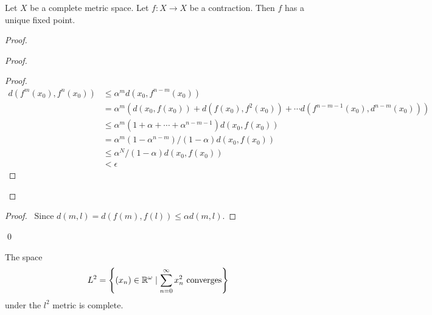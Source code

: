 \begin{proposition}
    Let $X$ be a complete metric space. Let $f : X \rightarrow X$ be a contraction.
    Then $f$ has a unique fixed point.
\end{proposition}

\begin{proof}
    \pf
    \begin{proof}
        \begin{proof}
            \pf
            \begin{align*}
                d(f^m(x_0),f^n(x_0)) & \leq \alpha^m d(x_0,f^{n-m}(x_0)) \\
                & = \alpha^m (d(x_0,f(x_0)) + d(f(x_0),f^2(x_0)) + \cdots d(f^{n-m-1}(x_0),d^{n-m}(x_0))) \\
                & \leq \alpha^m (1 + \alpha + \cdots + \alpha^{n-m-1}) d(x_0,f(x_0)) \\
                & = \alpha^m (1 - \alpha^{n-m})/(1 - \alpha) d(x_0,f(x_0))  \\
                & \leq \alpha^N / (1 - \alpha) d(x_0, f(x_0)) \\ 
                & < \epsilon
            \end{align*}
        \end{proof}
    \end{proof}
    \begin{proof}
        \pf\ Since $d(m,l) = d(f(m),f(l)) \leq \alpha d(m,l)$.
    \end{proof}
    \qed
\end{proof}

\begin{proposition}
    The space \[ L^2 = \left\{ (x_n) \in \mathbb{R}^\omega \mid \sum_{n=0}^\infty x_n^2 \text{ converges} \right\} \] under the
    $l^2$ metric is complete.
\end{proposition}

